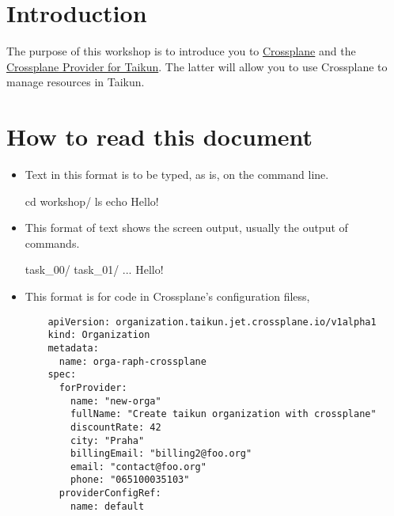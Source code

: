 \section{Introduction}
The purpose of this workshop is to introduce you to
\href{https://www.terraform.io/intro/index.html}{Crossplane}
and the \href{https://registry.terraform.io/providers/itera-io/taikun/latest}{Crossplane Provider for Taikun}.
The latter will allow you to use Crossplane to manage resources in Taikun.

\section{How to read this document}

\begin{itemize}
  \item Text in this format is to be typed, as is, on the command line.
\begin{shell}
cd workshop/
ls
echo Hello!
\end{shell}
\item This format of text shows the screen output, usually the output of commands.
\begin{raw}
task_00/
task_01/
...
Hello!
\end{raw}
\item This format is for code in Crossplane's configuration filess,
\begin{verbatim}
    apiVersion: organization.taikun.jet.crossplane.io/v1alpha1
    kind: Organization
    metadata:
      name: orga-raph-crossplane
    spec:
      forProvider:
        name: "new-orga"
        fullName: "Create taikun organization with crossplane"
        discountRate: 42
        city: "Praha"
        billingEmail: "billing2@foo.org"
        email: "contact@foo.org"
        phone: "065100035103"
      providerConfigRef:
        name: default
\end{verbatim}
\end{itemize}
